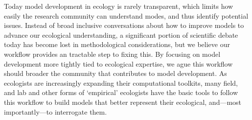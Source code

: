 \documentclass[11pt]{article}
\begin{document}
Today model development in ecology is rarely transparent, which limits how easily the research community can understand modes, and thus identify potential issues. Instead of broad inclusive conversations about how to improve models to advance our ecological understanding, a significant portion of scientific debate today has become lost in methodological considerations, but we believe our workflow provides an tractable step to fixing this. By focusing on model development more tightly tied to ecological expertise, we ague this workflow should broader the community that contributes to model development. As ecologists are increasingly expanding their computational toolkits, many field, and lab and other forms of `empirical' ecologists have the basic tools to follow this workflow to build models that better represent their ecological, and---most importantly---to interrogate them.





\end{document}
